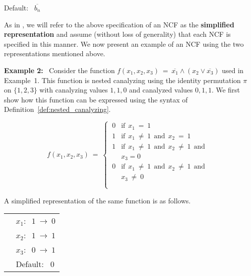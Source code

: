 \noindent
\hspace*{0.5in} Default:~ $\overline{b_n}$

\medskip
\noindent
As in \cite{Stearns-etal-2018}, we will refer to the above specification
of an NCF as the \textbf{simplified representation} and assume
(without loss of generality) that each NCF is specified in this manner.
We now present an example of an NCF using the two representations
mentioned above.


\medskip
\noindent
\textbf{Example 2:}~ Consider the function 
$f(x_1, x_2, x_3) ~=~ \overline{x_1} \wedge (x_2 \vee \overline{x_3})$
used in Example~1.
This function is nested canalyzing using the identity permutation $\pi$ on $\{1,2,3\}$
with canalyzing values $1,1,0$ and canalyzed values $0, 1, 1$.
We first show how this function can be expressed using the syntax of
Definition~\ref{def:nested_canalyzing}.

\[
f(x_1, x_2, x_3) ~=~ 
   \begin{cases}
       \:0 & \mathrm{if~~} x_{1} ~=~ 1 \\
       \:1 & \mathrm{if~~} x_{1} ~\neq~ 1 \mathrm{~~and~~}
            x_{2} ~=~ 1 \\
       \:1 & \mathrm{if~~} x_{1} ~\neq~ 1 \mathrm{~~and~~}
            x_{2} ~\neq~ 1 \mathrm{~~and~~}\\ 
           &x_{3} = 0 \\
       \:0 & \mathrm{if~~} x_{1} ~\neq~ 1 \mathrm{~~and~~} 
             x_{2} ~\neq~ 1 \mathrm{~~and~~}\\ 
           & x_{3} ~\neq~ 0 \\ \\ 
   \end{cases}
\]

\medskip
\noindent
A simplified representation of the same function is as follows.

\bigskip

\noindent
\begin{tabular}{ll}
\hspace*{0.5in} & $x_1:~$  $1 ~\longrightarrow~ 0$ \\ [0.5ex]
\hspace*{0.5in} & $x_2:~$  $1 ~\longrightarrow~ 1$ \\ [0.5ex]
\hspace*{0.5in} & $x_3:~$  $0 ~\longrightarrow~ 1$ \\ [0.5ex]
\hspace*{0.5in} & Default:~ $0$ \\
\end{tabular}

